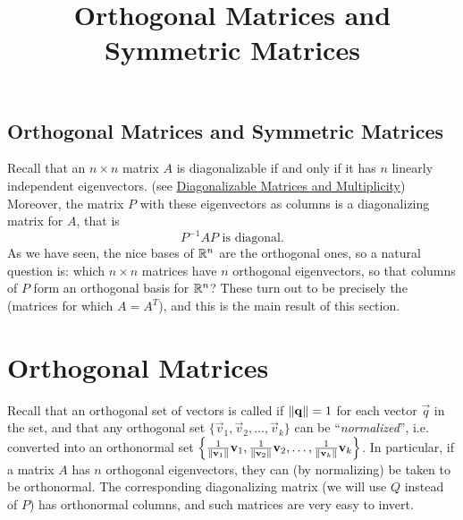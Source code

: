 \documentclass{ximera}
\title{Orthogonal Matrices and Symmetric Matrices} \license{CC BY-NC-SA 4.0}
\begin{document}
\begin{abstract}

\end{abstract}
\maketitle

\begin{onlineOnly}
\section*{Orthogonal Matrices and Symmetric Matrices}
\end{onlineOnly}

Recall that an $n \times n$ matrix $A$ is diagonalizable if and only if it has $n$ linearly independent eigenvectors.  (see \href{https://ximera.osu.edu/linearalgebradzv3/LinearAlgebraInteractiveIntro/EIG-0050/main}{Diagonalizable Matrices and Multiplicity}) Moreover, the matrix $P$ with these eigenvectors as columns is a diagonalizing matrix for $A$, that is
\begin{equation*}
P^{-1}AP \mbox{ is diagonal.}
\end{equation*}
As we have seen, the nice bases of $\mathbb{R}^n$ are the orthogonal ones, so a natural question is: which $n \times n$ matrices have $n$ orthogonal eigenvectors, so that columns of $P$ form an orthogonal basis for $\mathbb{R}^n$? These turn out to be precisely the  (matrices for which $A=A^T$), and this is the main result of this section.

\section*{Orthogonal Matrices}
Recall that an orthogonal set of vectors is called  if $\left\lVert\mathbf{q}\right\rVert = 1$ for each vector $\vec{q}$ in the set, and that any orthogonal set $\{\vec{v}_{1}, \vec{v}_{2}, \dots, \vec{v}_{k}\}$ can be ``\textit{normalized}'', i.e. converted into an orthonormal set $\left\{ \frac{1}{\left\lVert\mathbf{v}_{1}\right\rVert}\mathbf{v}_{1}, \frac{1}{\left\lVert\mathbf{v}_{2}\right\rVert}\mathbf{v}_{2}, \dots, \frac{1}{\left\lVert\mathbf{v}_{k}\right\rVert}\mathbf{v}_{k} \right\}$. In particular, if a matrix $A$ has $n$ orthogonal eigenvectors, they can (by normalizing) be taken to be orthonormal. The corresponding diagonalizing matrix (we will use $Q$ instead of $P$) has orthonormal columns, and such matrices are very easy to invert.
\end{document}
